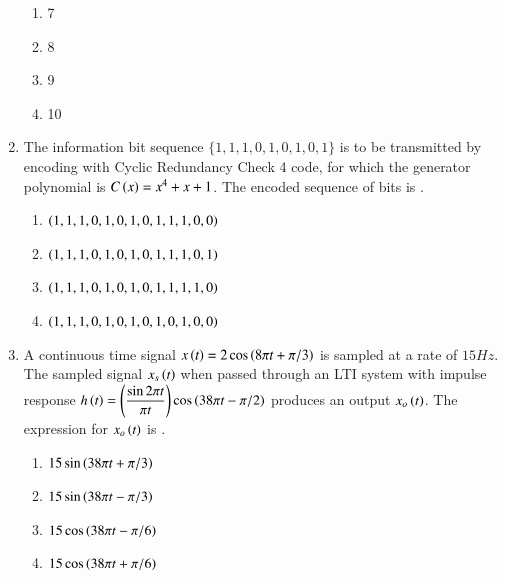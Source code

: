 \documentclass[journal,12pt,onecolumn]{IEEEtran}
\theoremstyle{remark}
\begin{document}
\begin{enumerate}
\hfill{}
\begin{multicols}{4}
\begin{enumerate}
    \item 7
    \item 8
    \item 9
    \item 10
\end{enumerate}
\end{multicols}

\item The information bit sequence $\{1, 1, 1, 0, 1, 0, 1, 0, 1\}$ is to be transmitted by encoding with Cyclic Redundancy Check 4  code, for which the generator polynomial is $C\left(x\right) = x^4 + x + 1$. The encoded sequence of bits is \underline{\hspace{2cm}}.
\hfill{}
\begin{multicols}{2}
\begin{enumerate}
    \item $\left(1, 1, 1, 0, 1, 0, 1, 0, 1, 1, 1, 0, 0\right)$
    \item $\left(1, 1, 1, 0, 1, 0, 1, 0, 1, 1, 1, 0, 1\right)$
    \item $\left(1, 1, 1, 0, 1, 0, 1, 0, 1, 1, 1, 1, 0\right)$
    \item $\left(1, 1, 1, 0, 1, 0, 1, 0, 1, 0, 1, 0, 0\right)$
\end{enumerate}
\end{multicols}

\item A continuous time signal $x\left(t\right) = 2 \cos\left(8\pi t + \pi/3\right)$ is sampled at a rate of $15 Hz$. The sampled signal $x_s\left(t\right)$ when passed through an LTI system with impulse response $h\left(t\right) = \left(\dfrac{\sin 2\pi t}{\pi t}\right) \cos\left(38\pi t - \pi/2\right)$ produces an output $x_o\left(t\right)$. The expression for $x_o\left(t\right)$ is \underline{\hspace{2cm}}.
\hfill{}
\begin{multicols}{2}
\begin{enumerate}
    \item $15 \sin\left(38\pi t + \pi/3\right)$
    \item $15 \sin\left(38\pi t - \pi/3\right)$
    \item $15 \cos\left(38\pi t - \pi/6\right)$
    \item $15 \cos\left(38\pi t + \pi/6\right)$
\end{enumerate}
\end{multicols}


\end{enumerate}
\end{document}
